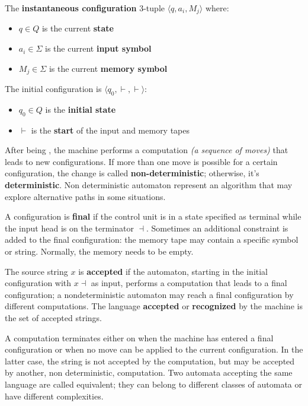 \documentclass[english]{article}
\begin{document}
\begin{definition}
  \label{def:instantaneous-configuration}
  The \textbf{instantaneous configuration} \(3\)-tuple \(\langle q, a_i, M_j \rangle\) where:

  \begin{itemize}
    \item \(q \in Q\) is the current \textbf{state}
    \item  \(a_i \in \Sigma\) is the current \textbf{input symbol}
    \item \(M_j \in \Sigma\) is the current \textbf{memory symbol}
  \end{itemize}

  The initial configuration is \(\langle q_0, \vdash, \vdash \rangle\):

  \begin{itemize}
    \item \(q_0 \in Q\) is the \textbf{initial state}
    \item \(\vdash\) is the \textbf{start} of the input and memory tapes
  \end{itemize}
\end{definition}

After being , the machine performs a computation \textit{(a sequence of moves)} that leads to new configurations.
If more than one move is possible for a certain configuration, the change is called \textbf{non-deterministic};
otherwise, it's \textbf{deterministic}.
Non deterministic automaton represent an algorithm that may explore alternative paths in some situations.

A configuration is \textbf{final} if the control unit is in a state specified as terminal while the input head is on the terminator \(\dashv\).
Sometimes an additional constraint is added to the final configuration: the memory tape may contain a specific symbol or string.
Normally, the memory needs to be empty.

The source string \(x\) is \textbf{accepted} if the automaton, starting in the initial configuration with \(x \dashv\) as input, performs a computation that leads to a final configuration;
a nondeterministic automaton may reach a final configuration by different computations.
The language \textbf{accepted} or \textbf{recognized} by the machine is the set of accepted strings.

A computation terminates either on when the machine has entered a final configuration or when no move can be applied to the current configuration.
In the latter case, the string is not accepted by the computation, but may be accepted by another, non deterministic, computation.
Two automata accepting the same language are called equivalent;
they can belong to different classes of automata or have different complexities.
\end{document}
